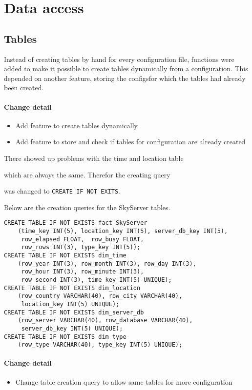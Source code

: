\section{Data access}

\subsection{Tables}
Instead of creating tables by hand for every configuration file, functions
were added to make it possible to create tables dynamically from
a configuration. This depended on another feature,
storing the configsfor which the tables had already been created.


\paragraph{Change detail}
\begin{itemize}
  \item Add feature to create tables dynamically
  \item Add feature to store and check if tables for configuration are already created
\end{itemize}

There showed up problems with the time and location table

which are always the same. Therefor the creating query

was changed to \texttt{CREATE IF NOT EXITS}.

Below are the creation queries for the SkyServer tables.
\begin{lstlisting}
CREATE TABLE IF NOT EXISTS fact_SkyServer 
	(time_key INT(5), location_key INT(5), server_db_key INT(5),
	 row_elapsed FLOAT,  row_busy FLOAT,
	 row_rows INT(3), type_key INT(5));
CREATE TABLE IF NOT EXISTS dim_time 
	(row_year INT(3), row_month INT(3), row_day INT(3),
	 row_hour INT(3), row_minute INT(3),
	 row_second INT(3), time_key INT(5) UNIQUE);
CREATE TABLE IF NOT EXISTS dim_location 
	(row_country VARCHAR(40), row_city VARCHAR(40),
	 location_key INT(5) UNIQUE);
CREATE TABLE IF NOT EXISTS dim_server_db 
	(row_server VARCHAR(40), row_database VARCHAR(40),
	 server_db_key INT(5) UNIQUE);
CREATE TABLE IF NOT EXISTS dim_type 
	(row_type VARCHAR(40), type_key INT(5) UNIQUE);
\end{lstlisting}

\paragraph{Change detail}
\begin{itemize}
  \item Change table creation query to allow same tables for more configuration
\end{itemize}

